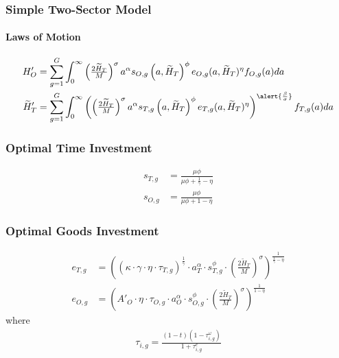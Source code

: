\documentclass[11pt]{beamer}
\begin{document}
 \begin{frame}
		\frametitle{Simple Two-Sector Model}
		\framesubtitle{Laws of Motion}
  \label{lom}
		\begin{align*}
			{H}_{O}' & = \sum_{g=1}^G \int_0^\infty \left(\tfrac{2 \widetilde{H}_T}{M}\right)^\sigma a^\alpha s_{O,g}\left(a,\widetilde{H}_T\right)^\phi e_{O,g}(a,\widetilde{H}_T)^\eta  f_{O,g}(a) da \\
			\widetilde{H}_{T}' & = \sum_{g=1}^G \int_0^\infty \left(\left(\tfrac{2 \widetilde{H}_T}{M}\right)^\sigma a^\alpha s_{T,g}\left(a,\widetilde{H}_T\right)^\phi e_{T,g}(a,\widetilde{H}_T)^\eta \right)^{\alert{\frac{\beta}{\sigma}}} f_{T,g}(a) da 
		\end{align*}
  \hyperlink{valuefn}{}
	\end{frame}

\begin{frame}
	\frametitle{Optimal Time Investment} 
	\label{time_inv}
	\begin{align}
		s_{T,g} & = \frac{\mu \phi}{\mu \phi+\tfrac{1}{\gamma}-\eta} \nonumber\\
		s_{O,g} & = \frac{\mu \phi}{\mu \phi+1-\eta} \nonumber
	\end{align}
	\hyperlink{eqm}{}
\end{frame}

\begin{frame}
	\frametitle{Optimal Goods Investment} 
	\label{good_inv}
	\begin{align}
		e_{T,g} & = \left( \left(\kappa \cdot \gamma \cdot \eta \cdot \tau_{T,g} \right)^\frac{1}{\gamma} \cdot a_T^{\alpha} \cdot s_{T,g}^{\phi} \cdot \left(\tfrac{2\widetilde{H}_T}{M}\right)^{\sigma}\right)^{\frac{1}{\frac{1}{\gamma}-\eta}}  \nonumber\\
		e_{O,g} & = \left( {{A'}_{O}} \cdot \eta \cdot\tau_{O,g} \cdot a_O^\alpha \cdot s_{O,g}^\phi \cdot  \left(\tfrac{2\widetilde{H}_T}{M}\right)^\sigma \right)^{\frac{1}{1-\eta}} \nonumber
	\end{align}
	where
	\begin{align}
		\tau_{i,g} =\frac{(1-t)(1-\tau^{\omega}_{i,g})}{1+\tau^e_{i,g}} \nonumber
	\end{align}
	\hyperlink{eqm}{}
\end{frame}
\end{document}
